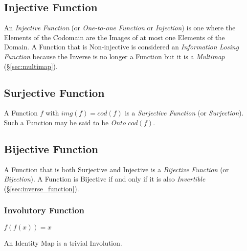 \subsection{Injective Function}\label{sec:injective_function}

An \emph{Injective Function} (or \emph{One-to-one Function} or
\emph{Injection}) is one where the Elements of the Codomain are the
Images of at most one Elements of the Domain. A Function that is
Non-injective is considered an \emph{Information Losing Function}
because the Inverse is no longer a Function but it is a
\emph{Multimap} (\S\ref{sec:multimap}).



\subsection{Surjective Function}\label{sec:surjective_function}

A Function $f$ with $img(f) = cod(f)$ is a \emph{Surjective Function}
(or \emph{Surjection}). Such a Function may be said to be \emph{Onto}
$cod(f)$.



\subsection{Bijective Function}\label{sec:bijective_function}

A Function that is both Surjective and Injective is a \emph{Bijective
  Function} (or \emph{Bijection}). A Function is Bijective if and only
if it is also \emph{Invertible} (\S\ref{sec:inverse_function}).



\subsubsection{Involutory Function}\label{sec:involution}

$f(f(x)) = x$

An Identity Map is a trivial Involution.



